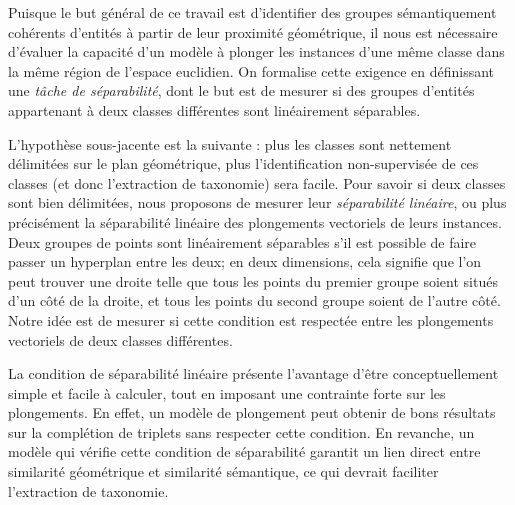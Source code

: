Puisque le but général de ce travail est d'identifier des groupes sémantiquement cohérents d'entités à partir de leur proximité géométrique, il nous est nécessaire d'évaluer la capacité d'un modèle à plonger les instances d'une même classe dans la même région de l'espace euclidien. On formalise cette exigence en définissant une \textit{tâche de séparabilité}, dont le but est de mesurer si des groupes d'entités appartenant à deux classes différentes sont linéairement séparables.

L'hypothèse sous-jacente est la suivante : plus les classes sont nettement délimitées sur le plan géométrique, plus l'identification non-supervisée de ces classes (et donc l'extraction de taxonomie) sera facile.
Pour savoir si deux classes sont bien délimitées, nous proposons de mesurer leur \textit{séparabilité linéaire}, ou plus précisément la séparabilité linéaire des plongements vectoriels de leurs instances. %
%
Deux groupes de points sont linéairement séparables s'il est possible de faire passer un hyperplan entre les deux; en deux dimensions, cela signifie que l'on peut trouver une droite telle que tous les points du premier groupe soient situés d'un côté de la droite, et tous les points du second groupe soient de l'autre côté. 
Notre idée est de mesurer si cette condition est respectée entre les plongements vectoriels de deux classes différentes.
%

La condition de séparabilité linéaire présente l'avantage d'être conceptuellement simple et facile à calculer, tout en imposant une contrainte forte sur les plongements. 
En effet, un modèle de plongement peut obtenir de bons résultats sur la complétion de triplets sans respecter cette condition. En revanche, un modèle qui vérifie cette condition de séparabilité garantit un lien direct entre similarité géométrique et similarité sémantique, ce qui devrait faciliter l'extraction de taxonomie.



